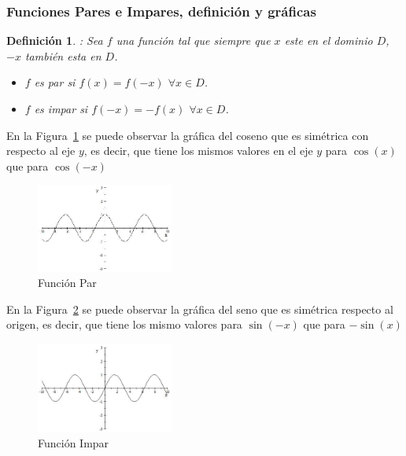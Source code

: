 \documentclass[a4paper]{article}
\newtheorem {dfn}{Definici\'on}
\begin{document}
\subsubsection{Funciones Pares e Impares, definici\'on y gr\'aficas}

\begin{dfn}
: Sea $f$ una funci\'on tal que siempre que $x$ este en el dominio $D$, $- x$
tambi\'en esta en $D$. 

\begin{itemize}
\item $f$ es par si $f\left(x\right)=f\left(-x\right)$ $\forall x \in D$. 

\item $f$ es impar si $f\left(-x\right)=-f\left(x\right)$ $\forall x \in D$. 
\end{itemize}
\end{dfn}

{} En la Figura~\ref{fig:coseno} se puede observar la gr\'afica del coseno
que es sim\'etrica con respecto al eje $y$, es decir, que tiene los mismos
valores en el eje $y$ para $\cos\left(x\right)$ que para $\cos\left(-x\right)
$  
\begin{figure}[h]
\centering
\includegraphics[width=0.40\textwidth]{f1p3.jpg}   
\caption{Funci\'on Par}
\label{fig:coseno}
\end{figure}

{} En la Figura~\ref{fig:seno} se puede observar la gr\'afica del seno que
es sim\'etrica respecto al origen, es decir, que tiene los mismo valores
para $\sin\left(-x\right)$ que para $-\sin\left(x\right)$  
\begin{figure}[h]
\centering
\includegraphics[width=0.40\textwidth]{f1p4.jpg}   
\caption{Funci\'on Impar}
\label{fig:seno}
\end{figure}
\end{document}
